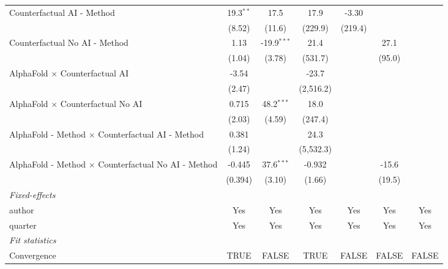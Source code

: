 \begin{tabular}{lcccccc}
   Counterfactual AI - Method                                 & 19.3$^{**}$ & 17.5          & 17.9       & -3.30   &        &   \\   
                                                              & (8.52)      & (11.6)        & (229.9)    & (219.4) &        &   \\   
   Counterfactual No AI - Method                              & 1.13        & -19.9$^{***}$ & 21.4       &         & 27.1   &   \\   
                                                              & (1.04)      & (3.78)        & (531.7)    &         & (95.0) &   \\   
   AlphaFold $\times$ Counterfactual AI                       & -3.54       &               & -23.7      &         &        &   \\   
                                                              & (2.47)      &               & (2,516.2)  &         &        &   \\   
   AlphaFold $\times$ Counterfactual No AI                    & 0.715       & 48.2$^{***}$  & 18.0       &         &        &   \\   
                                                              & (2.03)      & (4.59)        & (247.4)    &         &        &   \\   
   AlphaFold - Method $\times$ Counterfactual AI - Method     & 0.381       &               & 24.3       &         &        &   \\   
                                                              & (1.24)      &               & (5,532.3)  &         &        &   \\   
   AlphaFold - Method $\times$ Counterfactual No AI - Method  & -0.445      & 37.6$^{***}$  & -0.932     &         & -15.6  &   \\   
                                                              & (0.394)     & (3.10)        & (1.66)     &         & (19.5) &   \\   
   \midrule
   \emph{Fixed-effects}\\
   author                                                     & Yes         & Yes           & Yes        & Yes     & Yes    & Yes\\  
   quarter                                                    & Yes         & Yes           & Yes        & Yes     & Yes    & Yes\\  
   \midrule
   \emph{Fit statistics}\\
   Convergence                                                &TRUE         & FALSE         & TRUE       & FALSE   & FALSE  & FALSE\\  

\end{tabular}
